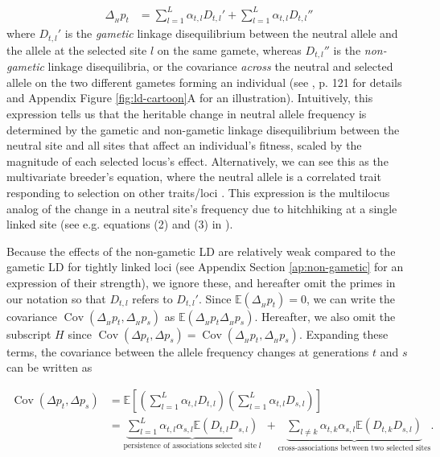 \documentclass[11pt]{article}
\newcommand{\nnn}{\nonumber}
\newcommand{\E}{\mathbb{E}}
\DeclareMathOperator{\cov}{Cov}
\begin{document}
\begin{align}
  \Delta_{_H} p_t &=  \sum_{l=1}^L \alpha_{t,l} D_{t,l}' + \sum_{l=1}^L \alpha_{t,l} D_{t,l}'' 
\label{eq:neut-change}
\end{align}
%
where $D_{t,l}'$ is the \emph{gametic} linkage disequilibrium between the
neutral allele and the allele at the selected site $l$ on the same gamete,
whereas $D_{t,l}''$ is the \emph{non-gametic} linkage disequilibria, or the
covariance \emph{across} the neutral and selected allele on the two different
gametes forming an individual (see \cite{Weir1996-mv}, p. 121 for details and
Appendix Figure \ref{fig:ld-cartoon}A for an illustration). Intuitively, this
expression tells us that the heritable change in neutral allele frequency is
determined by the gametic and non-gametic linkage disequilibrium between the
neutral site and all sites that affect an individual's fitness, scaled by the
magnitude of each selected locus's effect. Alternatively, we can see this as
the multivariate breeder's equation, where the neutral allele is a correlated
trait responding to selection on other traits/loci \parencite{Lande1979-rq}.
This expression is the multilocus analog of the change in a neutral site's
frequency due to hitchhiking at a single linked site (see e.g. equations (2)
and (3) in \cite{Stephan2006-xz}). 

Because the effects of the non-gametic LD are relatively weak compared to the
gametic LD for tightly linked loci (see Appendix Section \ref{ap:non-gametic}
for an expression of their strength), we ignore these, and hereafter omit the
primes in our notation so that $D_{t,l}$ refers to $D_{t,l}'$.  Since
$\E(\Delta_{_H} p_t) = 0$, we can write the covariance $\cov(\Delta_{_H} p_t,
\Delta_{_H} p_s)$ as $\E(\Delta_{_H} p_t \Delta_{_H} p_s)$.  Hereafter, we also
omit the subscript $H$ since $\cov(\Delta p_t, \Delta p_s) = \cov(\Delta_{_H}
p_t, \Delta_{_H} p_s)$. Expanding these terms, the covariance between the
allele frequency changes at generations $t$ and $s$ can be written as

\begin{align}
  \cov(\Delta p_t, \Delta p_s) &=  \E \left[\left(\sum_{l=1}^L \alpha_{t,l} D_{t,l}\right) \left( \sum_{l=1}^L \alpha_{t,l} D_{s,l} \right) \right]\nnn \\ 
                               &=  \underbrace{\sum_{l=1}^L \alpha_{t,l} \alpha_{s,l} \E(D_{t,l}  D_{s,l})}_{\text{persistence of associations selected site} \; l}  \; + 
  \underbrace{\sum_{l \ne k} \alpha_{t,k} \alpha_{s,l}\E(D_{t,k}  D_{s,l})}_{\text{cross-associations between two selected sites}}. \label{eq:multilocus-twopart}
\end{align}
\end{document}
